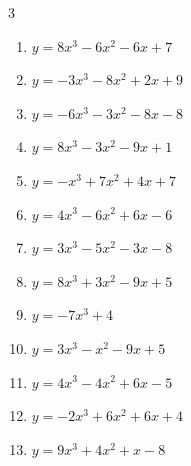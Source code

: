 \begin{multicols}{3}
\begin{enumerate}
  \item $y=8x^{3}-6x^{2}-6x+7$


  \item $y=-3x^{3}-8x^{2}+2x+9$


  \item $y=-6x^{3}-3x^{2}-8x-8$


  \item $y=8x^{3}-3x^{2}-9x+1$


  \item $y=-x^{3}+7x^{2}+4x+7$


  \item $y=4x^{3}-6x^{2}+6x-6$


  \item $y=3x^{3}-5x^{2}-3x-8$


  \item $y=8x^{3}+3x^{2}-9x+5$


  \item $y=-7x^{3}+4$


  \item $y=3x^{3}-x^{2}-9x+5$


  \item $y=4x^{3}-4x^{2}+6x-5$


  \item $y=-2x^{3}+6x^{2}+6x+4$


  \item $y=9x^{3}+4x^{2}+x-8$


\end{enumerate}
\end{multicols}
